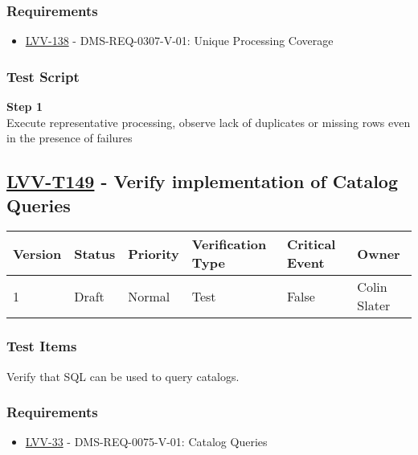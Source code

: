 \subsubsection{Requirements}\label{requirements-17}

\begin{itemize}
\tightlist
\item
  \href{https://jira.lsstcorp.org/browse/LVV-138}{LVV-138} -
  DMS-REQ-0307-V-01: Unique Processing Coverage
\end{itemize}

\subsubsection{Test Script}\label{test-script-17}

\textbf{Step 1}\\
Execute representative processing, observe lack of duplicates or missing
rows even in the presence of failures\\[2\baselineskip]

\hypertarget{lvv-t149---verify-implementation-of-catalog-queries}{\subsection{\texorpdfstring{\href{https://jira.lsstcorp.org/secure/Tests.jspa\#/testCase/LVV-T149}{LVV-T149}
- Verify implementation of Catalog
Queries}{LVV-T149 - Verify implementation of Catalog Queries}}\label{lvv-t149---verify-implementation-of-catalog-queries}}

\begin{longtable}[]{@{}llllll@{}}
\toprule
Version & Status & Priority & Verification Type & Critical Event &
Owner\tabularnewline
\midrule
\endhead
1 & Draft & Normal & Test & False & Colin Slater\tabularnewline
\bottomrule
\end{longtable}

\subsubsection{Test Items}\label{test-items-18}

Verify that SQL can be used to query catalogs.

\subsubsection{Requirements}\label{requirements-18}

\begin{itemize}
\tightlist
\item
  \href{https://jira.lsstcorp.org/browse/LVV-33}{LVV-33} -
  DMS-REQ-0075-V-01: Catalog Queries
\end{itemize}

